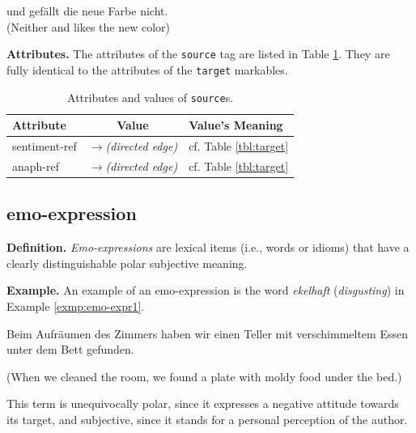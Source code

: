 \begin{example}
   und  gef\"allt die neue Farbe
  nicht.\\ (Neither  and  likes the new
  color)\label{exmp:source2}
\end{example}

\noindent\textbf{Attributes.} The attributes of the \texttt{source}
tag are listed in Table \ref{tbl:source}.  They are fully identical to
the attributes of the \texttt{target} markables.
\begin{center}
  \begin{table}[h]
    \caption{Attributes and values of \texttt{source}s.}
    \begin{tabular}{|l|c|p{0.935\clmnwidth}|}\hline
      Attribute & Value & Value's Meaning\\\hline

      sentiment-ref & \textit{$\longrightarrow$\newline(directed
        edge)} & cf. Table \ref{tbl:target}\\\hline

      anaph-ref & \textit{$\longrightarrow$\newline(directed edge)} &
      cf. Table \ref{tbl:target}\\\hline
    \end{tabular}\label{tbl:source}
  \end{table}
\end{center}

\subsection{emo-expression}
\noindent\textbf{Definition.} \emph{Emo-expressions} are lexical items
(i.e., words or idioms) that have a clearly distinguishable polar
subjective meaning.

\noindent\textbf{Example.} An example of an emo-expression is the word
\textit{ekelhaft} (\textit{disgusting}) in Example
\ref{exmp:emo-expr1}.
\begin{example}
  Beim Aufr\"aumen des Zimmers haben wir einen
   Teller mit verschimmeltem Essen unter dem
  Bett gefunden.

  (When we cleaned the room, we found a 
  plate with moldy food under the bed.)\label{exmp:emo-expr1}
\end{example}
\noindent{} This term is unequivocally polar, since it expresses a
negative attitude towards its target, and subjective, since it stands
for a personal perception of the author.

